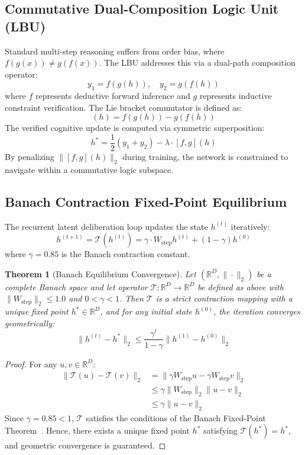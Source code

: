 \documentclass[11pt,a4paper]{article}
\newtheorem{theorem}{Theorem}
\begin{document}
\subsection{Commutative Dual-Composition Logic Unit (LBU)}
Standard multi-step reasoning suffers from order bias, where $f(g(x)) \ne g(f(x))$. The LBU addresses this via a dual-path composition operator:
\begin{equation}
y_1 = f(g(h)), \quad y_2 = g(f(h))
\end{equation}
where $f$ represents deductive forward inference and $g$ represents inductive constraint verification. The Lie bracket commutator is defined as:
\begin{equation}
[f, g](h) = f(g(h)) - g(f(h))
\end{equation}
The verified cognitive update is computed via symmetric superposition:
\begin{equation}
h^* = \frac{1}{2}(y_1 + y_2) - \lambda \cdot [f, g](h)
\end{equation}
By penalizing $\|[f, g](h)\|_2$ during training, the network is constrained to navigate within a commutative logic subspace.

\subsection{Banach Contraction Fixed-Point Equilibrium}
The recurrent latent deliberation loop updates the state $h^{(t)}$ iteratively:
\begin{equation}
h^{(t+1)} = \mathcal{T}(h^{(t)}) = \gamma \cdot W_{\text{step}} h^{(t)} + (1 - \gamma) h^{(0)}
\end{equation}
where $\gamma = 0.85$ is the Banach contraction constant.

\begin{theorem}[Banach Equilibrium Convergence]
Let $(\mathbb{R}^D, \|\cdot\|_2)$ be a complete Banach space and let operator $\mathcal{T}: \mathbb{R}^D \to \mathbb{R}^D$ be defined as above with $\|W_{\text{step}}\|_2 \le 1.0$ and $0 < \gamma < 1$. Then $\mathcal{T}$ is a strict contraction mapping with a unique fixed point $h^* \in \mathbb{R}^D$, and for any initial state $h^{(0)}$, the iteration converges geometrically:
\begin{equation}
\|h^{(t)} - h^*\|_2 \le \frac{\gamma^t}{1 - \gamma} \|h^{(1)} - h^{(0)}\|_2
\end{equation}
\end{theorem}
\begin{proof}
For any $u, v \in \mathbb{R}^D$:
\begin{align*}
\|\mathcal{T}(u) - \mathcal{T}(v)\|_2 &= \|\gamma W_{\text{step}} u - \gamma W_{\text{step}} v\|_2 \\
&\le \gamma \|W_{\text{step}}\|_2 \|u - v\|_2 \\
&\le \gamma \|u - v\|_2
\end{align*}
Since $\gamma = 0.85 < 1$, $\mathcal{T}$ satisfies the conditions of the Banach Fixed-Point Theorem~\cite{banach1922operations}. Hence, there exists a unique fixed point $h^*$ satisfying $\mathcal{T}(h^*) = h^*$, and geometric convergence is guaranteed.
\end{proof}
\end{document}
